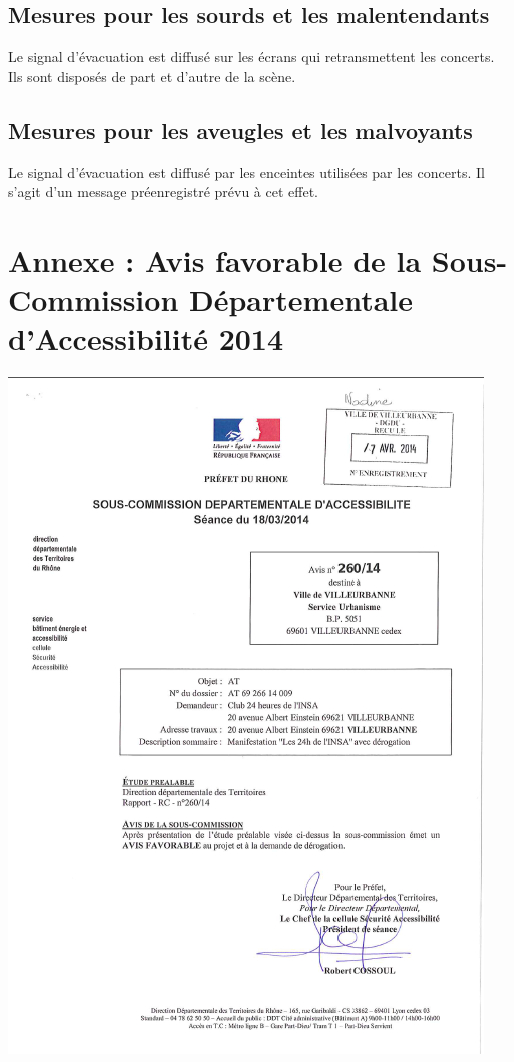 \documentclass[hidelinks, paper=a4, fontsize=13pt]{report}
\begin{document}
\subsection{Mesures pour les sourds et les malentendants}


Le signal d’évacuation est diffusé sur les écrans qui retransmettent les concerts. Ils sont disposés de part et d’autre de la scène.


\subsection{Mesures pour les aveugles et les malvoyants}


Le signal d’évacuation est diffusé par les enceintes utilisées par les concerts. Il s’agit d’un message préenregistré prévu à cet effet.
\newpage
\section{Annexe : Avis favorable de la Sous-Commission Départementale d'Accessibilité 2014}

\begin{center}
\includegraphics[scale=0.85]{Annexes/Documents/SCDAcces}
\end{center}
\end{document}
